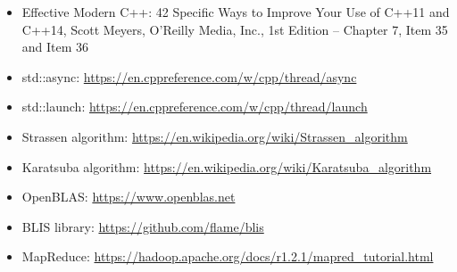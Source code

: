 

\begin{itemize}
\item
Effective Modern C++: 42 Specific Ways to Improve Your Use of C++11 and C++14, Scott Meyers, O’Reilly Media, Inc., 1st Edition – Chapter 7, Item 35 and Item 36

\item
std::async: \url{https://en.cppreference.com/w/cpp/thread/async}

\item
std::launch: \url{https://en.cppreference.com/w/cpp/thread/launch}

\item
Strassen algorithm: \url{https://en.wikipedia.org/wiki/Strassen_algorithm}

\item
Karatsuba algorithm: \url{https://en.wikipedia.org/wiki/Karatsuba_algorithm}

\item
OpenBLAS: \url{https://www.openblas.net}

\item
BLIS library: \url{https://github.com/flame/blis}

\item
MapReduce: \url{https://hadoop.apache.org/docs/r1.2.1/mapred_tutorial.html}
\end{itemize}